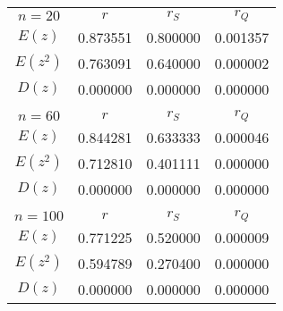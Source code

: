 \begin{table}[H]
    \centering
    \begin{tabular}{c|c|c|c}
        $$n=20$$ & $r$ & $r_{S}$ & $r_{Q}$ \\
        $E(z)$ & 0.873551 & 0.800000 & 0.001357 \\
        $E(z^2)$ & 0.763091 & 0.640000 & 0.000002 \\
        $D(z)$ & 0.000000 & 0.000000 & 0.000000 \\
        \hline
        \multicolumn{4}{c}{} \\
        $$n=60$$ & $r$ & $r_{S}$ & $r_{Q}$ \\
        $E(z)$ & 0.844281 & 0.633333 & 0.000046 \\
        $E(z^2)$ & 0.712810 & 0.401111 & 0.000000 \\
        $D(z)$ & 0.000000 & 0.000000 & 0.000000 \\
        \hline
        \multicolumn{4}{c}{} \\
        $$n=100$$ & $r$ & $r_{S}$ & $r_{Q}$ \\
        $E(z)$ & 0.771225 & 0.520000 & 0.000009 \\
        $E(z^2)$ & 0.594789 & 0.270400 & 0.000000 \\
        $D(z)$ & 0.000000 & 0.000000 & 0.000000 \\
    \end{tabular}
    \caption{}
    \label{}
\end{table}